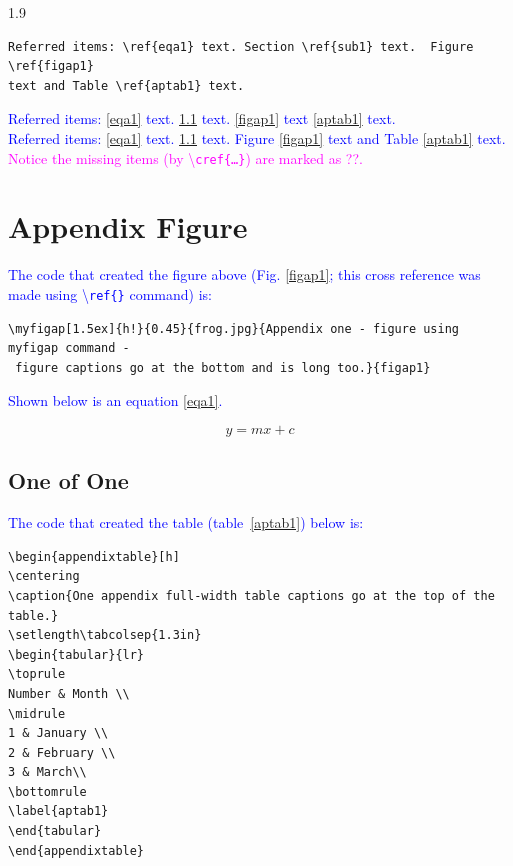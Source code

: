 \documentclass[phd]{ndsu-thesis-2022}
\newcommand\myspacing{1.9} %
\newcommand\italk[1]{\textcolor{blue}{#1}}  %
\newcommand\cmd[1]{\textbackslash\texttt{#1}}  %
\begin{document}
\begin{spacing}{\myspacing}
{\begin{verbatim}
Referred items: \ref{eqa1} text. Section \ref{sub1} text.  Figure \ref{figap1} 
text and Table \ref{aptab1} text.
\end{verbatim}
}

\italk{Referred items: \cref{eqa1} text. \cref{sub1} text.  \cref{figap1} text \cref{aptab1} text. \\
Referred items: \ref{eqa1} text. \ref{sub1} text.  Figure \ref{figap1} text and Table \ref{aptab1} text.
\\ \textcolor{magenta}{Notice the missing items (by \cmd{cref\{\ldots\}}) are marked as ??.}}

\section{Appendix Figure}


\italk{The code that created the figure above (Fig. \ref{figap1}; this cross reference was made using \cmd{ref\{\}} command) is:}

{\onehalfspacing
\begin{verbatim}
\myfigap[1.5ex]{h!}{0.45}{frog.jpg}{Appendix one - figure using myfigap command -
 figure captions go at the bottom and is long too.}{figap1}
\end{verbatim}
}

\italk{Shown below is an equation \cref{eqa1}. } 
 
\vspace{-4ex}
\begin{equation}
y = mx + c
\label{eqa1}
\end{equation}

\subsection{One of One}
\label{sub1}
\kant[2]

\italk{The code that created the table (table~\ref{aptab1}) below is:}

{\onehalfspacing
\begin{verbatim}
\begin{appendixtable}[h]
\centering
\caption{One appendix full-width table captions go at the top of the table.}
\setlength\tabcolsep{1.3in}
\begin{tabular}{lr}
\toprule
Number & Month \\
\midrule
1 & January \\
2 & February \\
3 & March\\
\bottomrule
\label{aptab1}
\end{tabular}
\end{appendixtable}
\end{verbatim}
}


\end{spacing}
\end{document}
